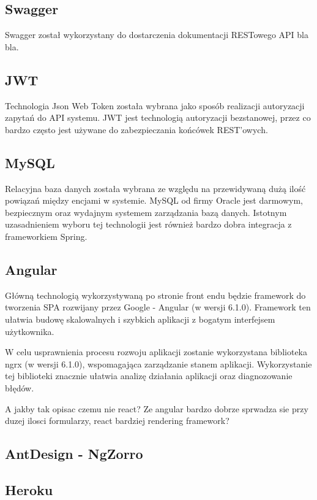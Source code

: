 \subsection{Swagger}

Swagger został wykorzystany do dostarczenia dokumentacji RESTowego API bla bla.

\subsection{JWT}

Technologia Json Web Token została wybrana jako sposób realizacji autoryzacji zapytań do API systemu. JWT jest technologią autoryzacji bezstanowej, przez co bardzo często jest używane do zabezpieczania końcówek REST'owych.

\subsection{MySQL} 

Relacyjna baza danych została wybrana ze względu na przewidywaną dużą ilość powiązań między encjami w systemie. MySQL od firmy Oracle jest darmowym, bezpiecznym oraz wydajnym systemem zarządzania bazą danych.  Istotnym uzasadnieniem wyboru tej technologii jest również bardzo dobra integracja z frameworkiem Spring.

\subsection{Angular}

Główną technologią wykorzystywaną po stronie front endu będzie framework do tworzenia SPA rozwijany przez Google - Angular (w wersji 6.1.0). Framework ten ułatwia budowę skalowalnych i szybkich aplikacji z bogatym interfejsem użytkownika. 

W celu usprawnienia procesu rozwoju aplikacji zostanie wykorzystana biblioteka ngrx (w wersji 6.1.0), wspomagająca zarządzanie stanem aplikacji. Wykorzystanie tej biblioteki znacznie ułatwia analizę działania aplikacji oraz diagnozowanie błędów.

A jakby tak opisac czemu nie react? Ze angular bardzo dobrze sprwadza sie przy duzej ilosci formularzy, react bardziej rendering framework?

\subsection{AntDesign - NgZorro}

\subsection{Heroku}
